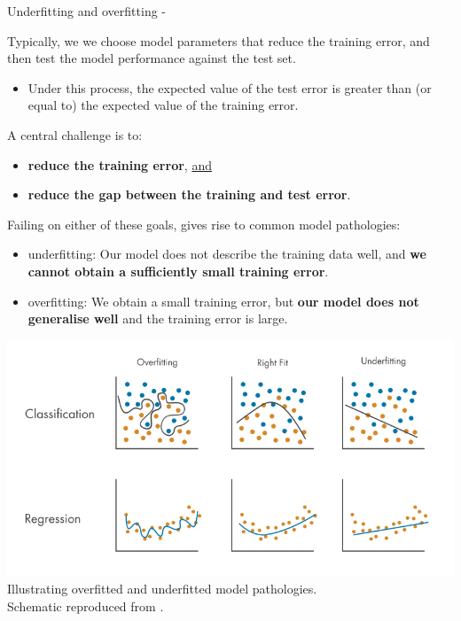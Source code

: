

\begin{frame}[t,allowframebreaks]{Underfitting and overfitting -}

    Typically, 
    we we choose model parameters that reduce the training error, 
    and then test the model performance against the test set.
    \begin{itemize}
    \item 
    Under this process, 
    the expected value of the test error 
    is greater than (or equal to)  
    the expected value of the training error.
    \end{itemize}
 
    \vspace{0.2cm}
    
    A central challenge is to:
    \begin{itemize}
     \item {\bf reduce the training error}, \underline{and}
     \item {\bf reduce the gap between the training and test error}.
    \end{itemize}
 
    \vspace{0.2cm}   
 
    Failing on either of these goals, gives rise to common model pathologies:
    \begin{itemize}
      \item {}\Gls{underfitting}:
      Our model does not describe the training data well,
      and {\bf we cannot obtain a sufficiently small training error}.
      \item {}\Gls{overfitting}:
      We obtain a small training error,
      but {\bf our model does not generalise well} and  
      the training error is large. 
    \end{itemize}
 
    \framebreak
 
 
    \begin{center}
         \includegraphics[width=1.0\textwidth]
             {./images/training_issues/over_and_underfitting_1.png}\\
         {\tiny 
             Illustrating overfitted and underfitted model pathologies.\\
             \color{col:attribution} 
             Schematic reproduced from \cite{MathWorks:Overfitting}.\\
         }
     \end{center}


\end{frame}
